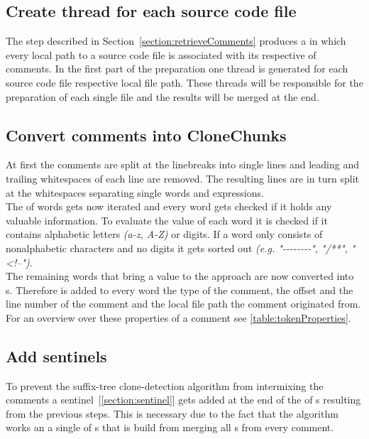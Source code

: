 \subsection{Create thread for each source code file}
The step described in Section~\ref{section:retrieveComments} produces a  in which every local path to a source code file is associated with its respective  of comments.
In the first part of the preparation one thread is generated for each source code file respective local file path. These threads will be responsible for the preparation of each single file and the results will be merged at the end.

\subsection{Convert comments into CloneChunks}
At first the comments are split at the linebreaks into single lines and leading and trailing whitespaces of each line are removed. The resulting lines are in turn split at the whitespaces separating single words and expressions.\\
The  of words gets now iterated and every word gets checked if it holds any valuable information. To evaluate the value of each word it is checked if it contains alphabetic letters \textit{(a-z, A-Z)} or digits. If a word only consists of nonalphabetic characters and no digits it gets sorted out \textit{(e.g. "-{}-{}-{}-{}-{}-{}-{}-", "/**", "<!--")}.\\
The remaining words that bring a value to the approach are now converted into s. Therefore is added to every word the type of the comment, the offset and the line number of the comment and the local file path the comment originated from.\\
For an overview over these properties of a comment see \ref{table:tokenProperties}.

\subsection{Add sentinels}
To prevent the suffix-tree clone-detection algorithm from intermixing the comments a sentinel~[\ref{section:sentinel}] gets added at the end of the  of s resulting from the previous steps. This is necessary due to the fact that the algorithm works an a single  of s that is build from merging all s from every comment.

